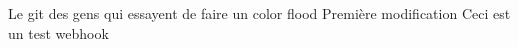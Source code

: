 Le git des gens qui essayent de faire un color flood Première modification Ceci est un test webhook 
